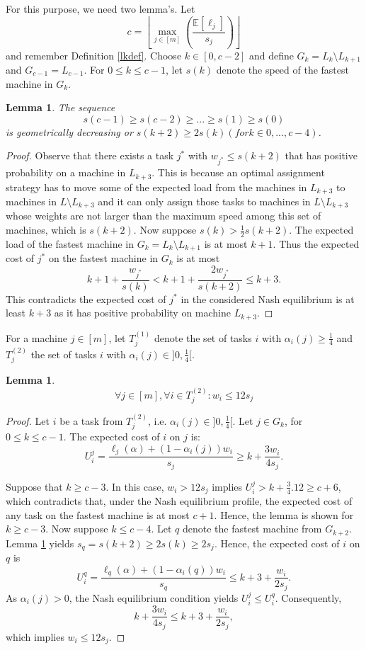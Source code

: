 \documentclass[a4paper,11pt]{article}
\newtheorem{lemma}[theorem]{Lemma}
\newcommand{\E}{{\mathbb E}}
\begin{document}
For this purpose, we need two lemma's. Let $$c = \left\lfloor\max_{j\in[m]}\left(\frac{\E[\ell_j]}{s_j}\right)\right\rfloor$$ and remember Definition \ref{lkdef}. Choose $k \in [0, c-2]$ and define $G_k = L_k\setminus L_{k+1}$ and $G_{c-1}=L_{c-1}$. For $0 \leq k \leq c-1$, let $s(k)$ denote the speed of the fastest machine in $G_k$.

\begin{lemma}\label{geometrisch}
The sequence
$$s(c-1) \geq s(c-2) \geq ... \geq s(1) \geq s(0)$$
is geometrically decreasing or $s(k+2) \geq 2s(k) (for k \in {0,...,c-4})$.
\end{lemma}

\begin{proof}
Observe that there exists a task $j^*$ with $w_{j^*} \leq s(k+2)$ that has positive probability on a machine in $L_{k+3}$. This is because an optimal assignment strategy has to move some of the expected load from the machines in $L_{k+3}$ to machines in $L\setminus L_{k+3}$ and it can only assign those tasks to machines in $L\setminus L_{k+3}$ whose weights are not larger than the maximum speed among this set of machines, which is $s(k+2)$. Now suppose $s(k)>\frac{1}{2} s(k+2)$. The expected load of the fastest machine in $G_k = L_k\setminus L_{k+1}$ is at most $k+1$. Thus the expected cost of $j^*$ on the fastest machine in $G_k$ is at most
$$k+1 + \frac{w_{j^*}}{s(k)} < k + 1 + \frac{2w_{j^*}}{s(k+2)} \leq k+3.$$
This contradicts the expected cost of $j^*$ in the considered Nash equilibrium is at least $k+3$ as it has positive probability on machine $L_{k+3}$.
\end{proof}

For a machine $j \in [m]$, let $T_j^{(1)}$ denote the set of tasks $i$ with $\alpha_i(j) \geq \frac{1}{4}$ and $T_j^{(2)}$ the set of tasks $i$ with $\alpha_i(j) \in ]0, \frac{1}{4}[$.

\begin{lemma}\label{tj}
$$\forall j \in [m], \forall i \in T^{(2)}_j: w_i\leq 12s_j$$
\end{lemma}

\begin{proof}
Let $i$ be a task from $T^{(2)}_j$, i.e. $\alpha_i(j) \in ]0,\frac{1}{4}[$. Let $j \in G_k$, for $0\leq k \leq c-1$. The expected cost of $i$ on $j$ is:
$$U^j_i =\frac{\ell_j(\alpha) + (1 - \alpha_i(j))w_i }{s_j} \geq k + \frac{3w_i}{4s_j}.$$

Suppose that $k \geq c - 3$. In this case, $w_i > 12s_j$ implies $U_i^j > k + \frac{3}{4}.12 \geq c + 6$, which contradicts that, under the Nash equilibrium profile, the expected cost of any task on the fastest machine is at most $c + 1$. Hence, the lemma is shown for $k \geq c - 3$. Now suppose $k \leq c - 4$. Let $q$ denote the fastest machine from $G_{k+2}$. Lemma \ref{geometrisch} yields $s_q = s(k+2) \geq 2s(k) \geq 2s_j.$ Hence, the expected cost of $i$ on $q$ is
$$U_i^q = \frac{\ell_q(\alpha) + (1 - \alpha_i(q))w_i }{s_q}  \leq k + 3 + \frac{w_i}{2s_j}.$$
As $\alpha_i(j) > 0$, the Nash equilibrium condition yields $U_i^j \leq U_i^q$. Consequently,
$$k + \frac{3w_i}{4s_j} \leq k + 3 + \frac{w_i}{2s_j},$$
which implies $w_i \leq 12s_j.$
\end{proof}
\end{document}
